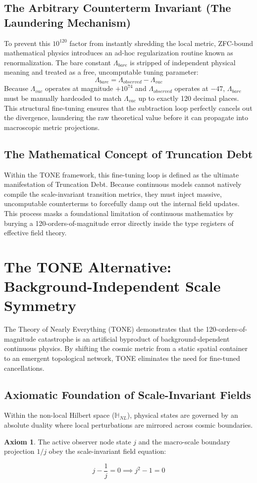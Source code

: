 \documentclass[11pt,a4paper]{article}
\theoremstyle{plain}
\theoremstyle{definition}
\newtheorem{axiom}{Axiom}
\begin{document}
\subsection{The Arbitrary Counterterm Invariant (The Laundering Mechanism)}
To prevent this $10^{120}$ factor from instantly shredding the local metric, ZFC-bound mathematical physics introduces an ad-hoc regularization routine known as renormalization. The bare constant $\Lambda_{bare}$ is stripped of independent physical meaning and treated as a free, uncomputable tuning parameter:
\begin{equation}
\Lambda_{bare} = \Lambda_{observed} - \Lambda_{vac}
\end{equation}
Because $\Lambda_{vac}$ operates at magnitude $+10^{74}$ and $\Lambda_{observed}$ operates at $-47$, $\Lambda_{bare}$ must be manually hardcoded to match $\Lambda_{vac}$ up to exactly 120 decimal places. This structural fine-tuning ensures that the subtraction loop perfectly cancels out the divergence, laundering the raw theoretical value before it can propagate into macroscopic metric projections.

\subsection{The Mathematical Concept of Truncation Debt}
Within the TONE framework, this fine-tuning loop is defined as the ultimate manifestation of Truncation Debt. Because continuous models cannot natively compile the scale-invariant transition metrics, they must inject massive, uncomputable counterterms to forcefully damp out the internal field updates. This process masks a foundational limitation of continuous mathematics by burying a 120-orders-of-magnitude error directly inside the type registers of effective field theory.

\newpage
\section{The TONE Alternative: Background-Independent Scale Symmetry}
The Theory of Nearly Everything (TONE) demonstrates that the 120-orders-of-magnitude catastrophe is an artificial byproduct of background-dependent continuous physics. By shifting the cosmic metric from a static spatial container to an emergent topological network, TONE eliminates the need for fine-tuned cancellations.

\subsection{Axiomatic Foundation of Scale-Invariant Fields}
Within the non-local Hilbert space ($\mathbb{H}_{NL}$), physical states are governed by an absolute duality where local perturbations are mirrored across cosmic boundaries.
\begin{axiom}
The active observer node state $j$ and the macro-scale boundary projection $1/j$ obey the scale-invariant field equation:
\end{axiom}
\begin{equation}
j - \frac{1}{j} = 0 \implies j^2 - 1 = 0
\end{equation}
\end{document}
